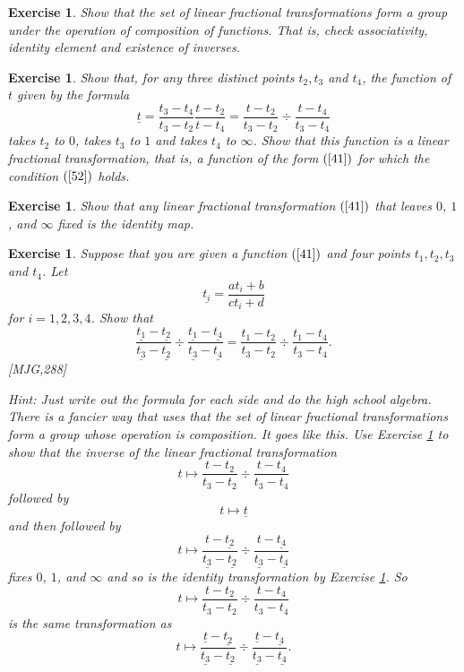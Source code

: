\documentclass{article}%
\newtheorem{exercise}[theorem]{Exercise}
\begin{document}
\begin{exercise}
Show that the set of linear fractional transformations form a group under the
operation of composition of functions. That is, check associativity, identity
element and existence of inverses.
\end{exercise}

\begin{exercise}
\label{59}Show that, for any three distinct points $t_{2},t_{3}$ and $t_{4}$,
the function of $t$ given by the formula%
\[
\underline{t}=\frac{t_{3}-t_{4}}{t_{3}-t_{2}}\frac{t-t_{2}}{t-t_{4}}%
=\frac{t-t_{2}}{t_{3}-t_{2}}\div\frac{t-t_{4}}{t_{3}-t_{4}}%
\]
takes $t_{2}$ to $0$, takes $t_{3}$ to $1$ and takes $t_{4}$ to $\infty$. Show
that this function is a linear fractional transformation, that is, a function
of the form $\left(  \ref{41}\right)  $ for which the condition $\left(
\ref{52}\right)  $ holds.
\end{exercise}

\begin{exercise}
\label{57}Show that any linear fractional transformation $\left(
\ref{41}\right)  $ that leaves $0$, $1$, and $\infty$ fixed is the identity map.
\end{exercise}

\begin{exercise}
\label{42}Suppose that you are given a function $\left(  \ref{41}\right)  $
and four points $t_{1},t_{2},t_{3}$ and $t_{4}$. Let
\[
\underline{t_{i}}=\frac{at_{i}+b}{ct_{i}+d}%
\]
for $i=1,2,3,4$. Show that%
\[
\frac{\underline{t_{1}}-\underline{t_{2}}}{\underline{t_{3}}-\underline{t_{2}%
}}\div\frac{\underline{t_{1}}-\underline{t_{4}}}{\underline{t_{3}}%
-\underline{t_{4}}}=\frac{t_{1}-t_{2}}{t_{3}-t_{2}}\div\frac{t_{1}-t_{4}%
}{t_{3}-t_{4}}.
\]
[MJG,288]

Hint: Just write out the formula for each side and do the high school algebra.
There is a fancier way that uses that the set of linear fractional
transformations form a group whose operation is composition. It goes like
this. Use Exercise \ref{59} to show that the inverse of the linear fractional
transformation
\[
t\mapsto\frac{t-t_{2}}{t_{3}-t_{2}}\div\frac{t-t_{4}}{t_{3}-t_{4}}%
\]
followed by%
\[
t\mapsto\underline{t}%
\]
and then followed by
\[
t\mapsto\frac{t-\underline{t_{2}}}{\underline{t_{3}}-\underline{t_{2}}}%
\div\frac{t-\underline{t_{4}}}{\underline{t_{3}}-\underline{t_{4}}}%
\]
fixes $0$, $1$, and $\infty$ and so is the identity transformation by Exercise
\ref{57}. So%
\[
t\mapsto\frac{t-t_{2}}{t_{3}-t_{2}}\div\frac{t-t_{4}}{t_{3}-t_{4}}%
\]
is the same transformation as%
\[
t\mapsto\frac{\underline{t}-\underline{t_{2}}}{\underline{t_{3}}%
-\underline{t_{2}}}\div\frac{\underline{t}-\underline{t_{4}}}{\underline
{t_{3}}-\underline{t_{4}}}.
\]

\end{exercise}
\end{document}
